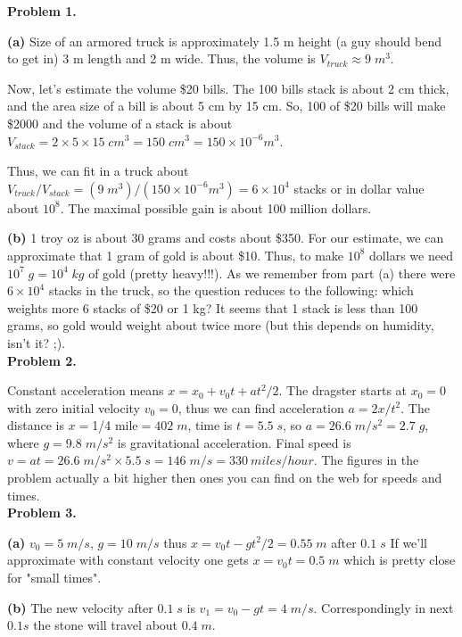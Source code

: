 \documentclass[12pt]{article}
\begin{document}
{\bf Problem 1.}

{\bf (a)}  Size of an armored truck is approximately 1.5 m height (a guy should bend to get in)
3 m length and 2 m  wide. Thus, the volume is $V_{truck} \approx 9 \; m^3$.

Now, let's estimate  the volume \$20 bills. The 100 bills stack is about 2 cm thick, and the area
size of a bill is about 5 cm by 15 cm. So, 100 of \$20 bills will make \$2000 and the volume of a stack is about $V_{stack}=2\times5\times15 \; cm^3 =150 \; cm^3 =150 \times10^{-6} m^3$.

Thus, we can fit in a truck about $V_{truck}/V_{stack}=( 9 \; m^3)/(150 \times10^{-6} m^3)=6 
\times 10^4$ stacks or in dollar value about  $10^8$.
The maximal possible gain is about 100 million dollars. 

{\bf (b)} 1 troy oz is about 30 grams and costs about \$350. For our estimate, we can approximate that 1 gram of gold is about \$10. Thus, to make $10^8$ dollars we need $10^7 \; g=10^4 \;kg$ of gold (pretty heavy!!!).  As we remember from part (a) there were $6\times 10^4$ stacks in the truck,
so the question reduces to the following: which weights more 6 stacks of \$20 or 1 kg?
It seems that 1 stack is less than 100 grams, so gold would weight about twice more
(but this depends on humidity, isn't it? ;).
\\

{\bf Problem 2.}

Constant acceleration means $x=x_{0} + v_{0} t + a t^2 /2$. The dragster starts at $x_{0}=0$
with zero initial velocity $v_{0}=0$, thus we can find acceleration $a= 2 x /t^2$.
The distance is  $x=$1/4 mile$=402\; m$, time is $t=5.5 \;s$, so $a=26.6\; m/s^2=2.7 \;g$, 
where $g=9.8\;m/s^2$ is gravitational acceleration. Final speed is 
$v=a t =26.6\; m/s^2 \times 5.5\; s=146\;m/s=330\:miles/hour$.  The figures in the problem actually a bit higher then ones you can find on the web for speeds and times.
\\

{\bf Problem 3.}

{\bf (a)}  $v_0=5\;m/s$, $g=10\;m/s$ thus $x=v_0 t -g t^2 /2=0.55 \;m$ after $0.1\;s$
If we'll approximate with constant velocity one gets $x=v_0 t =0.5 \;m$ which is pretty close
for "small times".

{\bf (b)} The new velocity after $0.1\;s$ is $v_1=v_0-gt=4\;m/s$. Correspondingly in next
$0.1s$ the stone will travel about $0.4\;m$.
\end{document}
